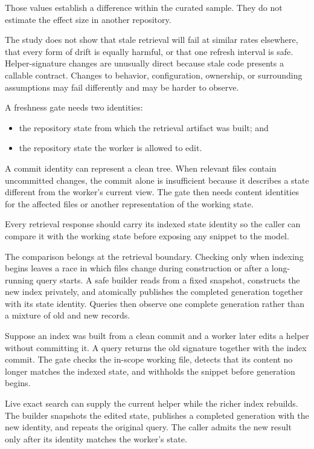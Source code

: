 Those values establish a difference within the curated sample. They do not estimate the effect size in another repository.

The study does not show that stale retrieval will fail at similar rates elsewhere, that every form of drift is equally harmful, or that one refresh interval is safe. Helper-signature changes are unusually direct because stale code presents a callable contract. Changes to behavior, configuration, ownership, or surrounding assumptions may fail differently and may be harder to observe.

A freshness gate needs two identities:

\begin{itemize}
\tightlist
\item
  the repository state from which the retrieval artifact was built; and
\item
  the repository state the worker is allowed to edit.
\end{itemize}

A commit identity can represent a clean tree. When relevant files contain uncommitted changes, the commit alone is insufficient because it describes a state different from the worker's current view. The gate then needs content identities for the affected files or another representation of the working state.

Every retrieval response should carry its indexed state identity so the caller can compare it with the working state before exposing any snippet to the model.

The comparison belongs at the retrieval boundary. Checking only when indexing begins leaves a race in which files change during construction or after a long-running query starts. A safe builder reads from a fixed snapshot, constructs the new index privately, and atomically publishes the completed generation together with its state identity. Queries then observe one complete generation rather than a mixture of old and new records.

Suppose an index was built from a clean commit and a worker later edits a helper without committing it. A query returns the old signature together with the index commit. The gate checks the in-scope working file, detects that its content no longer matches the indexed state, and withholds the snippet before generation begins.

Live exact search can supply the current helper while the richer index rebuilds. The builder snapshots the edited state, publishes a completed generation with the new identity, and repeats the original query. The caller admits the new result only after its identity matches the worker's state.

